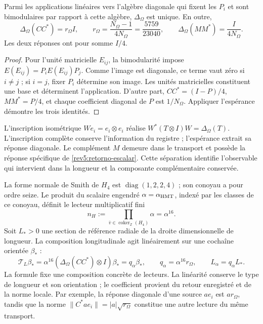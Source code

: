 \begin{proposition}
\label{rev5:retorno}
Parmi les applications linéaires vers l’algèbre diagonale qui fixent
les \(P_i\) et sont bimodulaires par rapport à cette algèbre,
\(\Delta_\Omega\) est unique. En outre,
\begin{equation}
 \Delta_\Omega(CC^*)=r_\Omega I,
 \qquad r_\Omega=\frac{N_\Omega-1}{4N_\Omega}
 =\frac{5759}{23040},
 \qquad \Delta_\Omega(MM^*)=\frac{I}{4N_\Omega}.
 \label{rev5:retorno-escalar}
\end{equation}
Les deux réponses ont pour somme \(I/4\).
\end{proposition}
\begin{proof}
Pour l’unité matricielle \(E_{ij}\), la bimodularité impose
\(E(E_{ij})=P_iE(E_{ij})P_j\). Comme l’image est diagonale,
ce terme vaut zéro si \(i\ne j\) ; si \(i=j\), fixer
\(P_i\) détermine son image. Les unités matricielles constituent
une base et déterminent l’application. D’autre part,
\(CC^*=(I-P)/4\), \(MM^*=P/4\), et chaque coefficient diagonal
de \(P\) est \(1/N_\Omega\). Appliquer l’espérance démontre
les trois identités.
\end{proof}

L'inscription isométrique \(We_i=e_i\otimes e_i\) réalise \(W^*(T\otimes I)W=\Delta_\Omega(T)\). L'inscription complète conserve l'information du registre ; l'espérance extrait sa réponse diagonale. Le complément \(M\) demeure dans le transport et possède la réponse spécifique de \eqref{rev5:retorno-escalar}. Cette séparation identifie l'observable qui intervient dans la longueur et la composante complémentaire conservée.

La forme normale de Smith de \(H_4\) est
\(\operatorname{diag}(1,2,2,4)\) ; son conoyau a pour ordre
seize. Le produit du scalaire engendré
\(\alpha=\alpha_{\rm HMT}\), indexé par les classes de ce
conoyau, définit le lecteur multiplicatif fini
\[
 n_H:=\prod_{\bar v\in\operatorname{coker}_{\mathbb Z}(H_4)}
 \alpha=\alpha^{16}.
\]
Soit \(L_*>0\) une section de référence
radiale de la droite dimensionnelle de longueur. La composition longitudinale
agit linéairement sur une cochaîne orientée \(\beta_*\) :
\begin{equation}
 \mathscr T_L\beta_*
 =\alpha^{16}(\Delta_\Omega(CC^*)\otimes I)\beta_*
 =q_\alpha\beta_*,\qquad
 q_\alpha=\alpha^{16}r_\Omega,\qquad
 L_\alpha=q_\alpha L_*.
 \label{rev5:longitud-generada}
\end{equation}
La formule fixe une composition concrète de lecteurs. La linéarité conserve le type de longueur et son orientation ; le coefficient provient du retour enregistré et de la norme locale. Par exemple, la réponse diagonale d'une source \(a e_i\) est \(a r_\Omega\), tandis que la norme \(\|C^*ae_i\|=|a|\sqrt{r_\Omega}\) constitue une autre lecture du même transport.

